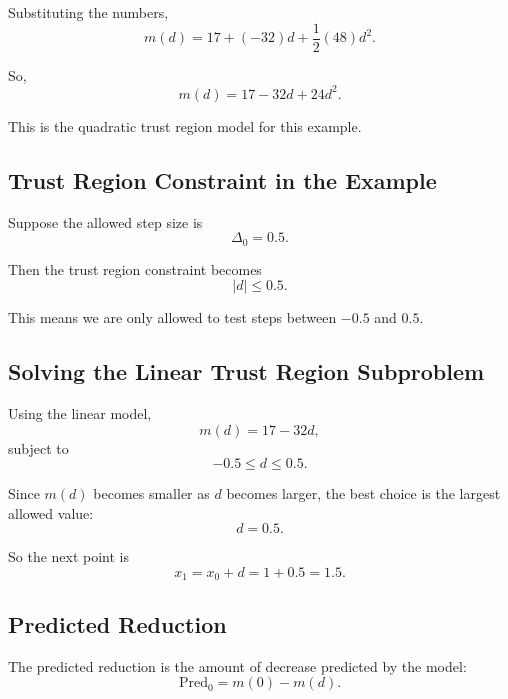 \documentclass{article}
\begin{document}
Substituting the numbers,
\begin{equation}
m(d) = 17 + (-32)d + \frac{1}{2}(48)d^2.
\end{equation}

So,
\begin{equation}
m(d) = 17 - 32d + 24d^2.
\end{equation}

This is the quadratic trust region model for this example.

\subsection{Trust Region Constraint in the Example}

Suppose the allowed step size is
\begin{equation}
\Delta_0 = 0.5.
\end{equation}

Then the trust region constraint becomes
\begin{equation}
|d| \leq 0.5.
\end{equation}

This means we are only allowed to test steps between $-0.5$ and $0.5$.

\subsection{Solving the Linear Trust Region Subproblem}

Using the linear model,
\begin{equation}
m(d) = 17 - 32d,
\end{equation}
subject to
\begin{equation}
-0.5 \leq d \leq 0.5.
\end{equation}

Since $m(d)$ becomes smaller as $d$ becomes larger, the best choice is the largest allowed value:
\begin{equation}
d = 0.5.
\end{equation}

So the next point is
\begin{equation}
x_1 = x_0 + d = 1 + 0.5 = 1.5.
\end{equation}

\subsection{Predicted Reduction}

The predicted reduction is the amount of decrease predicted by the model:
\begin{equation}
\mathrm{Pred}_0 = m(0) - m(d).
\end{equation}
\end{document}
